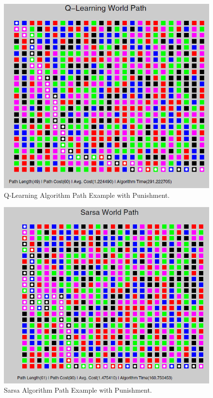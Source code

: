 \documentclass[12pt,american]{report}
\begin{document}
\begin{figure}
\centering
\includegraphics[scale=.75]{images/q-learning-example.PNG}
\caption{Q-Learning Algorithm Path Example with Punishment.}
\label{fig:q-learning example}
\end{figure}

\begin{figure}
\centering
\includegraphics[scale=.75]{images/sarsa-example.PNG}
\caption{Sarsa Algorithm Path Example with Punishment.}
\label{fig:sarsa_example}
\end{figure}
\end{document}
